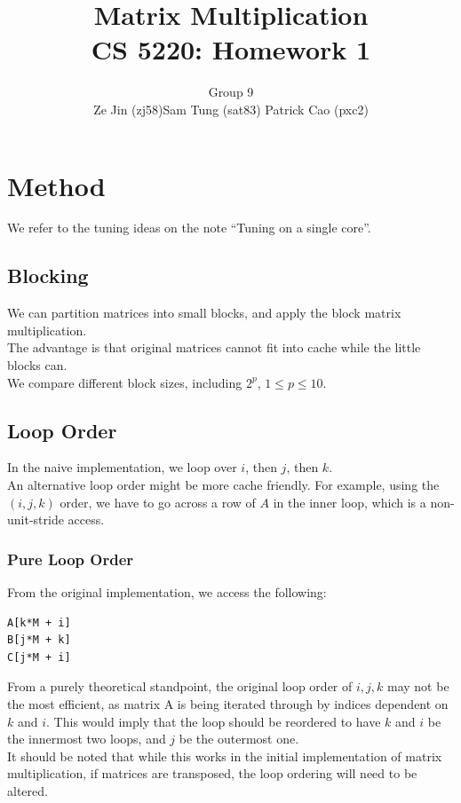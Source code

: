 \documentclass[12pt]{article}
\numberwithin{equation}{section}
\begin{document}
\title{\bf{Matrix Multiplication \\ CS 5220: Homework 1}}

\author{Group 9 \\ Ze Jin (zj58)\quad Sam Tung (sat83) \quad Patrick Cao (pxc2) \\}

\date{ }

\maketitle





\section{Method}

We refer to the tuning ideas on the note ``Tuning on a single core''.

\subsection{Blocking}

We can partition matrices into small blocks, and apply the block matrix multiplication.
\\
The advantage is that original matrices cannot fit into cache while the little blocks can.
\\
We compare different block sizes, including $2^p$, $1 \leq p \leq 10$.

\subsection{Loop Order}

In the naive implementation, we loop over $i$, then $j$, then $k$.
\\
An alternative loop order might be more cache friendly. For example, using the $(i, j, k)$ order, we have to go across a row of $A$ in the inner loop, which is a non-unit-stride access.

\subsubsection{Pure Loop Order}

From the original implementation, we access the following:
\begin{verbatim}
A[k*M + i]
B[j*M + k]
C[j*M + i]
\end{verbatim}
From a purely theoretical standpoint, the original loop order of $i,j,k$ may not be the most efficient, as matrix A is being iterated through by indices dependent on $k$ and $i$. This would imply that the loop should be reordered to have $k$ and $i$ be the innermost two loops, and $j$ be the outermost one. 
\\
It should be noted that while this works in the initial implementation of matrix multiplication, if matrices are transposed, the loop ordering will need to be altered.
\end{document}
